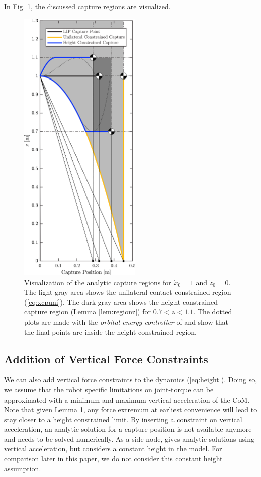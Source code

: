 \documentclass[letterpaper, 10 pt, conference]{ieeeconf}  %
\begin{document}
In Fig. \ref{fig:capregion}, the discussed capture regions are visualized.
\begin{figure}
      \centering
      \includegraphics[width=2.3in]{CPLimitsDark.png}
      \caption{Visualization of the analytic capture regions for $\dot{x}_0=1$ and $\dot{z}_0=0$. The light gray area shows the unilateral contact constrained region (\ref{eq:xcpuni}). The dark gray area shows the height constrained capture region (Lemma \ref{lem:regionz})  for $0.7<z<1.1$. The dotted plots are made with the \textit{orbital energy controller} of \cite{koolen2016balance} and show that the final points are inside the height constrained region.}
      \label{fig:capregion}
\end{figure}

\subsection{Addition of Vertical Force Constraints}\label{forcecapture}
We can also add vertical force constraints to the dynamics (\ref{eq:height}). Doing so, we assume that the robot specific limitations on joint-torque can be approximated with a minimum and maximum vertical acceleration of the CoM. Note that given Lemma 1, any force extremum at earliest convenience will lead to stay closer to a height constrained limit. By inserting a constraint on vertical acceleration, an analytic solution for a capture position is not available anymore and needs to be solved numerically. As a side node, \cite{gao2017increase} gives analytic solutions using vertical acceleration, but considers a constant height in the model. For comparison later in this paper, we do not consider this constant height assumption.
\end{document}
